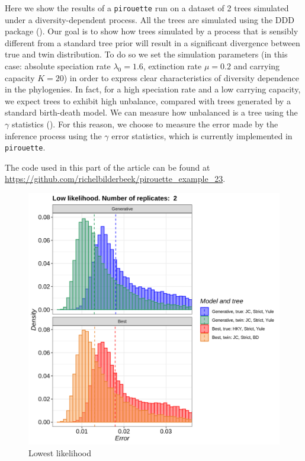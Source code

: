 
Here we show the results of a \verb;pirouette; run on a dataset 
of 2 trees simulated under a diversity-dependent process. 
All the trees are simulated using the DDD package (\cite{DDD}). 
Our goal is to show how trees simulated by a process that is 
sensibly different from a standard tree prior will result in a 
significant divergence between true and twin distribution. 
To do so we set the simulation parameters (in this case: 
absolute speciation rate $\lambda_0 = 1.6$, 
extinction rate $\mu = 0.2$ and carrying capacity $K = 20$) 
in order to express clear characteristics of diversity dependence in the 
phylogenies. In fact, for a high speciation rate and a low carrying capacity, 
we expect trees to exhibit high unbalance, compared with trees generated 
by a standard birth-death model. 
We can measure how unbalanced is a tree using the $\gamma$ 
statistics (\cite{pybus2000testing}). For this reason, we choose to 
measure the error made by the inference process using the $\gamma$ error statistics, 
which is currently implemented in \verb;pirouette;.

The code used in this part of the article can be found at 
\url{https://github.com/richelbilderbeek/pirouette_example_23}.

\begin{figure}[H]
  \includegraphics[width=\textwidth]{pirouette_example_23/errors_low.png}
  \caption{Lowest likelihood}
\end{figure}

